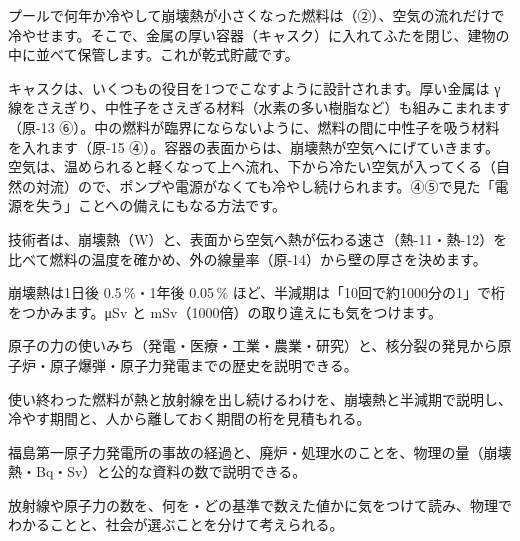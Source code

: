 \begin{phkougaku}
プールで何年か冷やして崩壊熱が小さくなった燃料は（②）、空気の流れだけで冷やせます。そこで、金属の厚い容器（キャスク）に入れてふたを閉じ、建物の中に並べて保管します。これが乾式貯蔵です。

キャスクは、いくつもの役目を1つでこなすように設計されます。厚い金属は γ線をさえぎり、中性子をさえぎる材料（水素の多い樹脂など）も組みこまれます（原-13 ⑥）。中の燃料が臨界にならないように、燃料の間に中性子を吸う材料を入れます（原-15 ④）。容器の表面からは、崩壊熱が空気へにげていきます。空気は、温められると軽くなって上へ流れ、下から冷たい空気が入ってくる（自然の対流）ので、ポンプや電源がなくても冷やし続けられます。④⑤で見た「電源を失う」ことへの備えにもなる方法です。

技術者は、崩壊熱（W）と、表面から空気へ熱が伝わる速さ（熱-11・熱-12）を比べて燃料の温度を確かめ、外の線量率（原-14）から壁の厚さを決めます。

\begin{phketa}[原子の力とつきあうときの数]
崩壊熱は1日後 0.5\,\%・1年後 0.05\,\% ほど、半減期は「10回で約1000分の1」で桁をつかみます。\si{\micro Sv} と mSv（1000倍）の取り違えにも気をつけます。
\end{phketa}
\end{phkougaku}


\begin{furikaeri}
\begin{checklist}
\item 原子の力の使いみち（発電・医療・工業・農業・研究）と、核分裂の発見から原子炉・原子爆弾・原子力発電までの歴史を説明できる。
\item 使い終わった燃料が熱と放射線を出し続けるわけを、崩壊熱と半減期で説明し、冷やす期間と、人から離しておく期間の桁を見積もれる。
\item 福島第一原子力発電所の事故の経過と、廃炉・処理水のことを、物理の量（崩壊熱・Bq・Sv）と公的な資料の数で説明できる。
\item 放射線や原子力の数を、何を・どの基準で数えた値かに気をつけて読み、物理でわかることと、社会が選ぶことを分けて考えられる。
\end{checklist}
\end{furikaeri}
